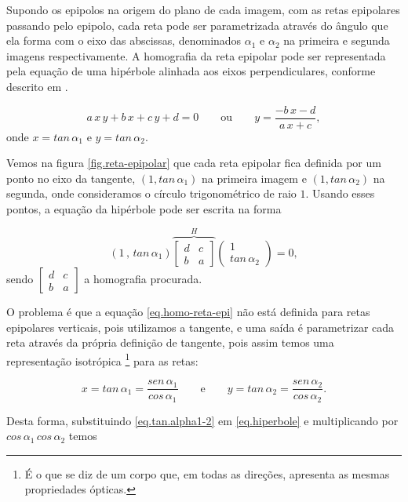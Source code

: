 Supondo os epipolos na origem do plano de cada imagem, com as retas epipolares passando pelo epipolo, cada reta pode ser parametrizada através do ângulo que ela forma com o eixo das abscissas, denominados $\alpha_1$ e $\alpha_2$ na primeira e segunda imagens respectivamente.
A homografia da reta epipolar pode ser representada pela equação de uma hipérbole alinhada aos eixos perpendiculares, conforme descrito em \cite{Fabbri:Kimia:IJCV2015}.

\begin{equation}\label{eq.hiperbole}
a\,x\,y+b\,x+c\,y+d=0 \qquad \text{ou} \qquad y=\frac{-b\,x-d}{a\,x+c},
\end{equation} 
onde $x=tan\,\alpha_1$ e $y=tan\,\alpha_2$. 

Vemos na figura \ref{fig.reta-epipolar} que cada reta epipolar fica definida por um ponto no eixo da tangente, $(1,tan\,\alpha_1)$ na primeira imagem e $(1,tan\,\alpha_2)$ na segunda, onde consideramos o círculo trigonométrico de raio $1$. Usando esses pontos, a equação da hipérbole pode ser escrita na forma

\begin{equation}\label{eq.homo-reta-epi}
(1\,,\,tan\,\alpha_1)
\overbrace{
\begin{bmatrix}
d&c\\
b&a
\end{bmatrix}
}^{H}
\begin{pmatrix}
1\\
tan\,\alpha_2
\end{pmatrix}
=0,
\end{equation}
sendo 
$\begin{bmatrix}d&c\\b&a\end{bmatrix}$ a homografia procurada.

O problema é que a equação \ref{eq.homo-reta-epi} não está definida para retas epipolares verticais, pois utilizamos a tangente, e uma saída é parametrizar cada reta através da própria definição de tangente, pois assim temos uma representação isotrópica \footnote{É o que se diz de um corpo que, em todas as direções, apresenta as mesmas propriedades ópticas.} para as retas:

\begin{equation}\label{eq.tan.alpha1-2}
x=tan\,\alpha_1=\frac{sen\,\alpha_1 }{cos\,\alpha_1} \qquad \text{e} \qquad y=tan\,\alpha_2=\frac{sen\,\alpha_2}{cos\,\alpha_2}.
\end{equation} 

Desta forma, substituindo \ref{eq.tan.alpha1-2} em \ref{eq.hiperbole} e multiplicando por $cos\,\alpha_1\,cos\,\alpha_2$ temos

